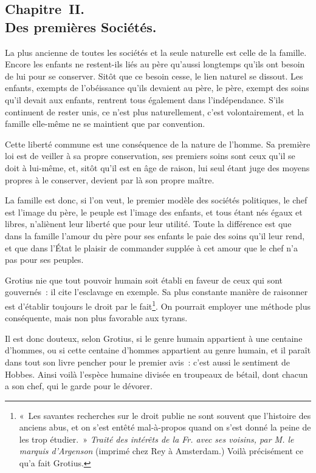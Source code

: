 \documentclass[french,twoside]{book} %
\begin{document}
\subsection[{Chapitre II. Des premières Sociétés.}]{Chapitre II. \\
Des premières Sociétés.}
\noindent La plus ancienne de toutes les sociétés et la seule naturelle est celle de la famille. Encore les enfants ne restent-ils liés au père qu’aussi longtemps qu’ils ont besoin de lui pour se conserver. Sitôt que ce besoin cesse, le lien naturel se dissout. Les enfants, exempts de l’obéissance qu’ils devaient au père, le père, exempt des soins qu’il devait aux enfants, rentrent tous également dans l’indépendance. S’ils continuent de rester unis, ce n’est plus naturellement, c’est volontairement, et la famille elle-même ne se maintient que par convention.\par
Cette liberté commune est une conséquence de la nature de l’homme. Sa première loi est de veiller à sa propre conservation, ses premiers soins sont ceux qu’il se doit à lui-même, et, sitôt qu’il est en âge de raison, lui seul étant juge des moyens propres à le conserver, devient par là son propre maître.\par
La famille est donc, si l’on veut, le premier modèle des sociétés politiques, le chef est l’image du père, le peuple est l’image des enfants, et tous étant nés égaux et libres, n’aliènent leur liberté que pour leur utilité. Toute la différence est que dans la famille l’amour du père pour ses enfants le paie des soins qu’il leur rend, et que dans l’État le plaisir de commander supplée à cet amour que le chef n’a pas pour ses peuples.\par
Grotius nie que tout pouvoir humain soit établi en faveur de ceux qui sont gouvernés : il cite l’esclavage en exemple. Sa plus constante manière de raisonner est d’établir toujours le droit par le fait\footnote{« Les savantes recherches sur le droit publie ne sont souvent que l’histoire des anciens abus, et on s’est entêté mal-à-propos quand on s’est donné la peine de les trop étudier. » {\itshape Traité des intérêts de la Fr. avec ses voisins, par M. le marquis d’Argenson} (imprimé chez Rey à Amsterdam.) Voilà précisément ce qu’a fait Grotius.}. On pourrait employer une méthode plus conséquente, mais non plus favorable aux tyrans.\par
Il est donc douteux, selon Grotius, si le genre humain appartient à une centaine d’hommes, ou si cette centaine d’hommes appartient au genre humain, et il paraît dans tout son livre pencher pour le premier avis : c’est aussi le sentiment de Hobbes. Ainsi voilà l’espèce humaine divisée en troupeaux de bétail, dont chacun a son chef, qui le garde pour le dévorer.\par
\end{document}
